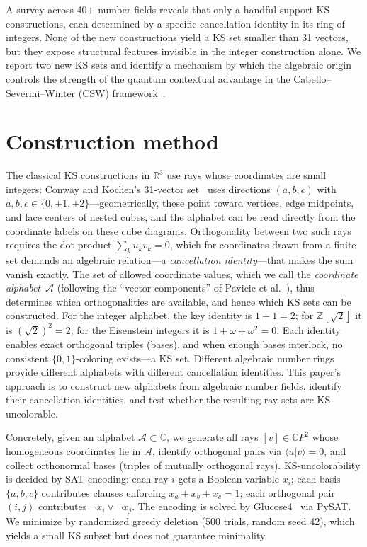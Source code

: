 \documentclass[twocolumn,prl,superscriptaddress,nofootinbib]{revtex4-2}
\newcommand{\R}{\mathbb{R}}
\newcommand{\C}{\mathbb{C}}
\newcommand{\Z}{\mathbb{Z}}
\begin{document}
A survey across 40+ number fields reveals that only a handful support KS constructions, each determined by a specific cancellation identity in its ring of integers. None of the new constructions yield a KS set smaller than 31 vectors, but they expose structural features invisible in the integer construction alone. We report two new KS sets and identify a mechanism by which the algebraic origin controls the strength of the quantum contextual advantage in the Cabello--Severini--Winter (CSW) framework~\cite{CSW2014}.

\section{Construction method}

The classical KS constructions in $\R^3$ use rays whose coordinates are small integers: Conway and Kochen's 31-vector set~\cite{ConwayKochen} uses directions $(a,b,c)$ with $a,b,c \in \{0, \pm 1, \pm 2\}$---geometrically, these point toward vertices, edge midpoints, and face centers of nested cubes, and the alphabet can be read directly from the coordinate labels on these cube diagrams.  Orthogonality between two such rays requires the dot product $\sum_k \bar{u}_k v_k = 0$, which for coordinates drawn from a finite set demands an algebraic relation---a \emph{cancellation identity}---that makes the sum vanish exactly.  The set of allowed coordinate values, which we call the \emph{coordinate alphabet}~$\mathcal{A}$ (following the ``vector components'' of Pavicic et al.~\cite{Pavicic2019}), thus determines which orthogonalities are available, and hence which KS sets can be constructed.  For the integer alphabet, the key identity is $1+1=2$; for $\Z[\sqrt{2}]$ it is $(\sqrt{2})^2 = 2$; for the Eisenstein integers it is $1+\omega+\omega^2 = 0$.  Each identity enables exact orthogonal triples (bases), and when enough bases interlock, no consistent $\{0,1\}$-coloring exists---a KS set.  Different algebraic number rings provide different alphabets with different cancellation identities.  This paper's approach is to construct new alphabets from algebraic number fields, identify their cancellation identities, and test whether the resulting ray sets are KS-uncolorable.

Concretely, given an alphabet $\mathcal{A} \subset \C$, we generate all rays $[v] \in \C P^2$ whose homogeneous coordinates lie in $\mathcal{A}$, identify orthogonal pairs via $\langle u | v \rangle = 0$, and collect orthonormal bases (triples of mutually orthogonal rays). KS-uncolorability is decided by SAT encoding: each ray $i$ gets a Boolean variable $x_i$; each basis $\{a,b,c\}$ contributes clauses enforcing $x_a + x_b + x_c = 1$; each orthogonal pair $(i,j)$ contributes $\neg x_i \vee \neg x_j$. The encoding is solved by Glucose4~\cite{AudemardSimon2018} via PySAT. We minimize by randomized greedy deletion (500 trials, random seed 42), which yields a small KS subset but does not guarantee minimality.
\end{document}
